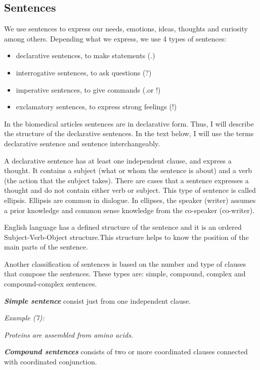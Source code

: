\subsection{Sentences}

We use sentences to express our needs, emotions, ideas, thoughts and curiosity among others. Depending what we express, we use 4 types of sentences:
\begin{itemize}
	\item declarative sentences, to make statements (.)
	\item interrogative sentences, to ask questions (?)
	\item imperative sentences, to give commands (.or !)
	\item exclamatory sentences, to express strong feelings (!)
\end{itemize}

In the biomedical articles sentences are in declarative form. Thus, I will describe the structure of the declarative sentences. In the text below, I will use the terms declarative sentence and sentence interchangeably.

A declarative sentence has at least one independent clause, and express a thought. It contains a subject (what or whom the sentence is about) and a verb (the action that the subject takes). There are cases that a sentence expresses a thought and do not contain either verb or subject. This type of sentence is called ellipsis. Ellipsis are common in dialogue. In ellipses, the speaker (writer) assumes a prior knowledge and common sense knowledge from the co-speaker (co-writer).

English language has a defined structure of the sentence and it is an ordered Subject-Verb-Object structure.This structure helps to know the position of the main parts of the sentence.

Another classification of sentences is based on the number and type of clauses that compose the sentences. These types are: simple, compound, complex and compound-complex sentences.

\emph{\textbf{Simple sentence}} consist just from one independent clause.

\emph{Example (7):}
\begin{changemargin}{10mm}{10mm}
   \emph{Proteins are assembled from amino acids.}
\end{changemargin}
\vspace{3mm}

\emph{\textbf{Compound sentences}} consists of two or more coordinated clauses connected with coordinated conjunction.\\

